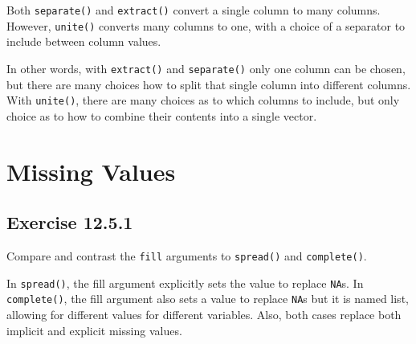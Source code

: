 \documentclass[]{book}
\newenvironment{Shaded}{\begin{snugshade}}{\end{snugshade}}
\newcommand{\CommentTok}[1]{\textcolor[rgb]{0.56,0.35,0.01}{\textit{#1}}}
\newcommand{\DataTypeTok}[1]{\textcolor[rgb]{0.13,0.29,0.53}{#1}}
\newcommand{\DecValTok}[1]{\textcolor[rgb]{0.00,0.00,0.81}{#1}}
\newcommand{\KeywordTok}[1]{\textcolor[rgb]{0.13,0.29,0.53}{\textbf{#1}}}
\newcommand{\NormalTok}[1]{#1}
\newcommand{\OperatorTok}[1]{\textcolor[rgb]{0.81,0.36,0.00}{\textbf{#1}}}
\newcommand{\StringTok}[1]{\textcolor[rgb]{0.31,0.60,0.02}{#1}}
\theoremstyle{plain}
\theoremstyle{remark}
\begin{document}
Both \texttt{separate()} and \texttt{extract()} convert a single column
to many columns. However, \texttt{unite()} converts many columns to one,
with a choice of a separator to include between column values.

\begin{Shaded}
\end{Shaded}

In other words, with \texttt{extract()} and \texttt{separate()} only one
column can be chosen, but there are many choices how to split that
single column into different columns. With \texttt{unite()}, there are
many choices as to which columns to include, but only choice as to how
to combine their contents into a single vector.

\hypertarget{missing-values-1}{%
\section{Missing Values}\label{missing-values-1}}

\hypertarget{exercise-12.5.1}{%
\subsection*{\texorpdfstring{Exercise
{12.5.1}}{Exercise 12.5.1}}\label{exercise-12.5.1}}

Compare and contrast the \texttt{fill} arguments to \texttt{spread()}
and \texttt{complete()}.

In \texttt{spread()}, the fill argument explicitly sets the value to
replace \texttt{NA}s. In \texttt{complete()}, the fill argument also
sets a value to replace \texttt{NA}s but it is named list, allowing for
different values for different variables. Also, both cases replace both
implicit and explicit missing values.
\end{document}
